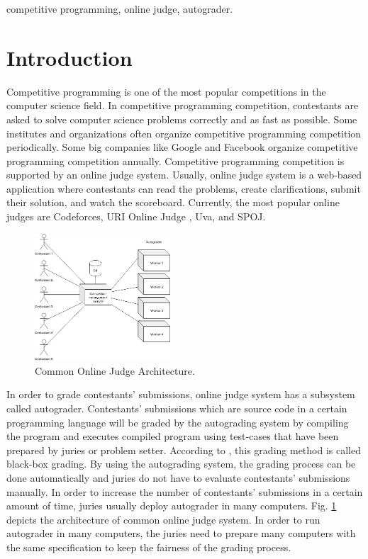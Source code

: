\documentclass[conference,a4paper]{IEEEtran}
\begin{document}
\begin{IEEEkeywords}
competitive programming, online judge, autograder.
\end{IEEEkeywords}

\section{Introduction}

Competitive programming is one of the most popular competitions in the computer science field. In competitive programming competition, contestants are asked to solve computer science problems correctly and as fast as possible. Some institutes and organizations often organize competitive programming competition periodically. Some big companies like Google and Facebook organize competitive programming competition annually. Competitive programming competition is supported by an online judge system. Usually, online judge system is a web-based application where contestants can read the problems, create clarifications, submit their solution, and watch the scoreboard. Currently, the most popular online judges are Codeforces, URI Online Judge \cite{uriojpaper}, Uva, and SPOJ.

\begin{figure}[htbp]
\centerline{\includegraphics[width=0.45\textwidth]{images/paper-architecture-old.jpeg}}
\caption{Common Online Judge Architecture.}
\label{architecture-old}
\end{figure}

In order to grade contestants' submissions, online judge system has a subsystem called autograder. Contestants' submissions which are source code in a certain programming language will be graded by the autograding system by compiling the program and executes compiled program using test-cases that have been prepared by juries or problem setter. According to \cite{jordanioi}, this grading method is called black-box grading. By using the autograding system, the grading process can be done automatically and juries do not have to evaluate contestants' submissions manually. In order to increase the number of contestants' submissions in a certain amount of time, juries usually deploy autograder in many computers. Fig. \ref{architecture-old} depicts the architecture of common online judge system. In order to run autograder in many computers, the juries need to prepare many computers with the same specification to keep the fairness of the grading process.
\end{document}
